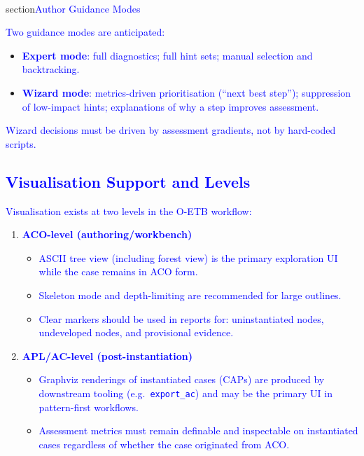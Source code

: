 \documentclass[11pt]{article}
\begin{document}
\subsub\\section{\textcolor{blue}{Author Guidance Modes}}

\textcolor{blue}{Two guidance modes are anticipated:}

\begin{itemize}[leftmargin=2em]
  \item \textcolor{blue}{\textbf{Expert mode}: full diagnostics; full hint sets; manual selection and backtracking.}
  \item \textcolor{blue}{\textbf{Wizard mode}: metrics-driven prioritisation (``next best step''); suppression of low-impact hints; explanations of why a step improves assessment.}
\end{itemize}

\textcolor{blue}{Wizard decisions must be driven by assessment gradients, not by hard-coded scripts.}

\subsection{\textcolor{blue}{Visualisation Support and Levels}}

\textcolor{blue}{Visualisation exists at two levels in the O-ETB workflow:}

\begin{enumerate}[leftmargin=2em]
  \item \textcolor{blue}{\textbf{ACO-level (authoring/workbench)}}
  \begin{itemize}[leftmargin=1.5em]
    \item \textcolor{blue}{ASCII tree view (including forest view) is the primary exploration UI while the case remains in ACO form.}
    \item \textcolor{blue}{Skeleton mode and depth-limiting are recommended for large outlines.}
    \item \textcolor{blue}{Clear markers should be used in reports for: uninstantiated nodes, undeveloped nodes, and provisional evidence.}
  \end{itemize}

  \item \textcolor{blue}{\textbf{APL/AC-level (post-instantiation)}}
  \begin{itemize}[leftmargin=1.5em]
    \item \textcolor{blue}{Graphviz renderings of instantiated cases (CAPs) are produced by downstream tooling (e.g.\ \texttt{export\_ac}) and may be the primary UI in pattern-first workflows.}
    \item \textcolor{blue}{Assessment metrics must remain definable and inspectable on instantiated cases regardless of whether the case originated from ACO.}
  \end{itemize}
\end{enumerate}
\end{document}
